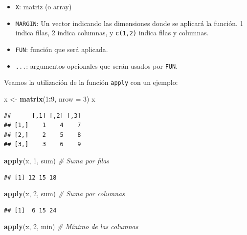 \documentclass[]{book}
\newenvironment{Shaded}{\begin{snugshade}}{\end{snugshade}}
\newcommand{\KeywordTok}[1]{\textcolor[rgb]{0.13,0.29,0.53}{\textbf{#1}}}
\newcommand{\DataTypeTok}[1]{\textcolor[rgb]{0.13,0.29,0.53}{#1}}
\newcommand{\DecValTok}[1]{\textcolor[rgb]{0.00,0.00,0.81}{#1}}
\newcommand{\StringTok}[1]{\textcolor[rgb]{0.31,0.60,0.02}{#1}}
\newcommand{\CommentTok}[1]{\textcolor[rgb]{0.56,0.35,0.01}{\textit{#1}}}
\newcommand{\OperatorTok}[1]{\textcolor[rgb]{0.81,0.36,0.00}{\textbf{#1}}}
\newcommand{\NormalTok}[1]{#1}
\providecommand{\tightlist}{%
  \setlength{\itemsep}{0pt}\setlength{\parskip}{0pt}}
\begin{document}
\begin{itemize}
\tightlist
\item
  \texttt{X}: matriz (o array)
\item
  \texttt{MARGIN}: Un vector indicando las dimensiones donde se aplicará
  la función. 1 indica filas, 2 indica columnas, y \texttt{c(1,2)}
  indica filas y columnas.
\item
  \texttt{FUN}: función que será aplicada.
\item
  \texttt{...}: argumentos opcionales que serán usados por \texttt{FUN}.
\end{itemize}

Veamos la utilización de la función \texttt{apply} con un ejemplo:

\begin{Shaded}
\begin{Highlighting}[]
\NormalTok{x <-}\StringTok{ }\KeywordTok{matrix}\NormalTok{(}\DecValTok{1}\OperatorTok{:}\DecValTok{9}\NormalTok{, }\DataTypeTok{nrow =} \DecValTok{3}\NormalTok{)}
\NormalTok{x}
\end{Highlighting}
\end{Shaded}

\begin{verbatim}
##      [,1] [,2] [,3]
## [1,]    1    4    7
## [2,]    2    5    8
## [3,]    3    6    9
\end{verbatim}

\begin{Shaded}
\begin{Highlighting}[]
\KeywordTok{apply}\NormalTok{(x, }\DecValTok{1}\NormalTok{, sum)    }\CommentTok{# Suma por filas}
\end{Highlighting}
\end{Shaded}

\begin{verbatim}
## [1] 12 15 18
\end{verbatim}

\begin{Shaded}
\begin{Highlighting}[]
\KeywordTok{apply}\NormalTok{(x, }\DecValTok{2}\NormalTok{, sum)    }\CommentTok{# Suma por columnas}
\end{Highlighting}
\end{Shaded}

\begin{verbatim}
## [1]  6 15 24
\end{verbatim}

\begin{Shaded}
\begin{Highlighting}[]
\KeywordTok{apply}\NormalTok{(x, }\DecValTok{2}\NormalTok{, min)    }\CommentTok{# Mínimo de las columnas}
\end{Highlighting}
\end{Shaded}
\end{document}
